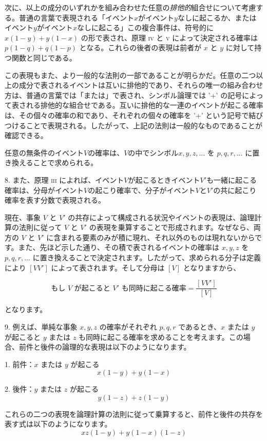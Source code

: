 \documentclass[a4paper,11pt,openany]{ltjsbook}
\begin{document}
次に、以上の成分のいずれかを組み合わせた任意の\emph{排他的}組合せについて考慮する。普通の言葉で表現される「イベント$x$がイベント$y$なしに起こるか、またはイベント$y$がイベント$x$なしに起こる」この複合事件は、符号的に $x(1-y) + y(1-x)$ の形で表され、原理 \textsc{iv} と \textsc{v} によって決定される確率は $p(1-q) + q(1-p)$ となる。これらの後者の表現は前者が $x$ と $y$ に対して持つ関数と同じである。

この表現もまた、より一般的な法則の一部であることが明らかだ。任意の二つ以上の成分で表されるイベントは互いに排他的であり、それらの唯一の組み合わせ方は、普通の言葉では「または」で表され、シンボル論理では '+' の記号によって表される排他的な組合せである。互いに排他的な一連のイベントが起こる確率は、その個々の確率の和であり、それぞれの個々の確率を '+' という記号で結びつけることで表現される。したがって、上記の法則は一般的なものであることが確認できる。

任意の無条件のイベント$V$の確率は、$V$の中でシンボル$x, y, z, \dotsc$ を $p, q, r, \dotsc$ に置き換えることで求められる。

8. また、原理 \textsc{iii} によれば、イベント$V$が起こるときイベント$V'$も一緒に起こる確率は、分母がイベント$V$の起こり確率で、分子がイベント$V$と$V'$の共に起こり確率を表す分数で表現される。

現在、事象 $V$ と $V'$ の共存によって構成される状況やイベントの表現は、論理計算の法則に従って $V$ と $V'$ の表現を乗算することで形成されます。なぜなら、両方の $V$ と $V'$ に含まれる要素のみが積に現れ、それ以外のものは現れないからです。また、先ほど示した通り、その積で表されるイベントの確率は $x, y, z$ を $p, q, r,\dotsc$ に置き換えることで決定されます。したがって、求められる分子は定義により $[VV']$ によって表されます。そして分母は $[V]$ となりますから、

\[
\text{もし $V$ が起こると $V'$ も同時に起こる確率} = \frac{[VV']}{[V]}
\]

となります。

9. 例えば、単純な事象 $x, y, z$ の確率がそれぞれ $p, q, r$ であるとき、$x$ または $y$ が起こると $y$ または $z$ も同時に起こる確率を求めることを考えます。この場合、前件と後件の論理的な表現は以下のようになります。

1. 前件：$x$ または $y$ が起こる
\[
x(1-y) + y(1-x)
\]

2. 後件：$y$ または $z$ が起こる
\[
y(1-z) + z(1-y)
\]

これらの二つの表現を論理計算の法則に従って乗算すると、前件と後件の共存を表す式は以下のようになります。
\[
xz(1-y) + y(1-x)(1-z)
\]
\end{document}
